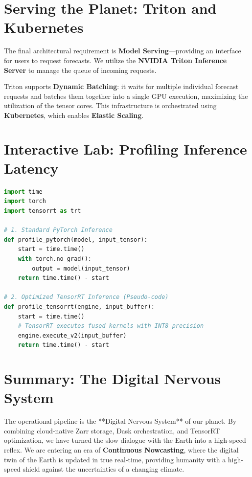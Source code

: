 \section{Serving the Planet: Triton and Kubernetes}

The final architectural requirement is \textbf{Model Serving}—providing an interface for users to request forecasts. We utilize the \textbf{NVIDIA Triton Inference Server} to manage the queue of incoming requests.

Triton supports \textbf{Dynamic Batching}: it waits for multiple individual forecast requests and batches them together into a single GPU execution, maximizing the utilization of the tensor cores. This infrastructure is orchestrated using \textbf{Kubernetes}, which enables \textbf{Elastic Scaling}. 

\section{Interactive Lab: Profiling Inference Latency}

\begin{lstlisting}[language=Python, caption=Profiling PyTorch vs. TensorRT Inference]
import time
import torch
import tensorrt as trt

# 1. Standard PyTorch Inference
def profile_pytorch(model, input_tensor):
    start = time.time()
    with torch.no_grad():
        output = model(input_tensor)
    return time.time() - start

# 2. Optimized TensorRT Inference (Pseudo-code)
def profile_tensorrt(engine, input_buffer):
    start = time.time()
    # TensorRT executes fused kernels with INT8 precision
    engine.execute_v2(input_buffer)
    return time.time() - start
\end{lstlisting}

\section{Summary: The Digital Nervous System}

The operational pipeline is the **Digital Nervous System** of our planet. By combining cloud-native Zarr storage, Dask orchestration, and TensorRT optimization, we have turned the slow dialogue with the Earth into a high-speed reflex. We are entering an era of \textbf{Continuous Nowcasting}, where the digital twin of the Earth is updated in true real-time, providing humanity with a high-speed shield against the uncertainties of a changing climate.

